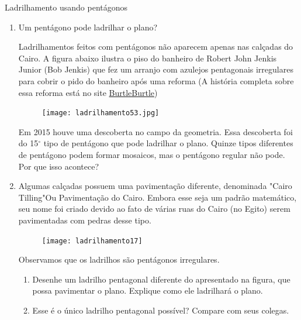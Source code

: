 \begin{task}{Ladrilhamento usando pentágonos}

\begin{enumerate}

	\item Um pentágono pode ladrilhar o plano?

Ladrilhamentos feitos com pentágonos não aparecem apenas nas calçadas do Cairo. A figura abaixo ilustra o piso do banheiro de Robert John Jenkis Junior (Bob Jenkis) que fez um arranjo com azulejos pentagonais irregulares para cobrir o pido do banheiro após uma reforma (A história completa sobre essa reforma está no site \href{http://burtleburtle.net/bob/other/bathroom.html}{BurtleBurtle})

\begin{figure}[H]
	\centering
	\texttt{[image: ladrilhamento53.jpg]}

\end{figure}

Em 2015 houve uma descoberta no campo da geometria. Essa descoberta foi do 15$^{\circ}$ tipo de pentágono que pode ladrilhar o plano. Quinze tipos diferentes de pentágono podem formar mosaicos, mas o pentágono regular não pode. Por que isso acontece?

\item Algumas calçadas possuem uma pavimentação diferente, denominada "Cairo Tilling"Ou Pavimentação do Cairo. Embora esse seja um padrão matemático, seu nome foi criado devido ao fato de várias ruas do Cairo (no Egito) serem pavimentadas com pedras desse tipo.

	\begin{figure}[H]
	\centering
	\texttt{[image: ladrilhamento17]}
	\end{figure}

Observamos que os ladrilhos são pentágonos irregulares.

	\begin{enumerate}
		\item Desenhe um ladrilho pentagonal diferente do apresentado na figura, que possa pavimentar o plano. Explique como ele ladrilhará o plano.
		\item Esse é o único ladrilho pentagonal possível? Compare com seus colegas.
	\end{enumerate}

\end{enumerate}
\end{task}

